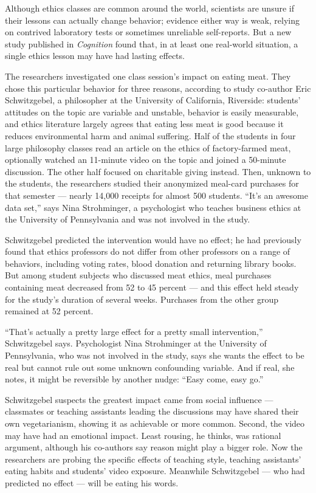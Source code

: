 \documentclass[UTF8,11pt]{ctexart}
\begin{document}
Although ethics classes are common around the world, scientists are unsure if their lessons can actually change behavior; evidence either way is weak, relying on contrived laboratory tests or sometimes unreliable self-reports. But a new study published in \textit{Cognition} found that, in at least one real-world situation, a single ethics lesson may have had lasting effects.


The researchers investigated one class session’s impact on eating meat. They chose this particular behavior for three reasons, according to study co-author Eric Schwitzgebel, a philosopher at the University of California, Riverside: students’ attitudes on the topic are variable and unstable, behavior is easily measurable, and ethics literature largely agrees that eating less meat is good because it reduces environmental harm and animal suffering. Half of the students in four large philosophy classes read an article on the ethics of factory-farmed meat, optionally watched an 11-minute video on the topic and joined a 50-minute discussion. The other half focused on charitable giving instead. Then, unknown to the students, the researchers studied their anonymized meal-card purchases for that semester — nearly 14,000 receipts for almost 500 students. “It’s an awesome data set,” says Nina Strohminger, a psychologist who teaches business ethics at the University of Pennsylvania and was not involved in the study.


Schwitzgebel predicted the intervention would have no effect; he had previously found that ethics professors do not differ from other professors on a range of behaviors, including voting rates, blood donation and returning library books. But among student subjects who discussed meat ethics, meal purchases containing meat decreased from 52 to 45 percent — and this effect held steady for the study’s duration of several weeks. Purchases from the other group remained at 52 percent.


“That’s actually a pretty large effect for a pretty small intervention,” Schwitzgebel says. Psychologist Nina Strohminger at the University of Pennsylvania, who was not involved in the study, says she wants the effect to be real but cannot rule out some unknown confounding variable. And if real, she notes, it might be reversible by another nudge: “Easy come, easy go.”


Schwitzgebel suspects the greatest impact came from social influence — classmates or teaching assistants leading the discussions may have shared their own vegetarianism, showing it as achievable or more common. Second, the video may have had an emotional impact. Least rousing, he thinks, was rational argument, although his co-authors say reason might play a bigger role. Now the researchers are probing the specific effects of teaching style, teaching assistants’ eating habits and students’ video exposure. Meanwhile Schwitzgebel — who had predicted no effect — will be eating his words.
\end{document}
